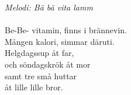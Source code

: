 {\footnotesize\textit{Melodi: Bä bä vita lamm}}\\
\\
Be-Be- vitamin, finns i brännevin.\\
Mången kalori, simmar däruti.\\
Helgdagssup åt far,\\
och söndagskrök åt mor\\
samt tre små huttar\\
åt lille lille bror.

